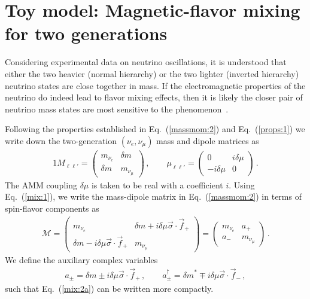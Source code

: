 \documentclass[addchapnum]{ws-rv961x669} %
\newcommand{\req}[1]{Eq.~(\ref{#1})}
\begin{document}
\section{Toy model: Magnetic-flavor mixing for two generations}
\label{sec:mix}
Considering experimental data on neutrino oscillations, it is understood that either the two heavier (normal hierarchy) or the two lighter (inverted hierarchy) neutrino states are close together in mass. If the electromagnetic properties of the neutrino do indeed lead to flavor mixing effects, then it is likely the closer pair of neutrino mass states are most sensitive to the phenomenon~\cite{Bethe:1986ej}. 

Following the properties established in \req{massmom:2} and \req{props:1} we write down the two-generation $(\nu_{e},\nu_{\mu})$ mass and dipole matrices as
\begin{alignat}{1}
	\label{mix:1} M_{\ell\ell'}= 
	\begin{pmatrix}
		m_{\nu_{e}} & {\delta m}\\
		{\delta m} & m_{\nu_{\mu}}
	\end{pmatrix}\,,\qquad
	\mu_{\ell\ell'} = 
	\begin{pmatrix}
		0 & i\delta\mu\\
		-i\delta\mu & 0
	\end{pmatrix}\,.
\end{alignat}
The AMM coupling $\delta\mu$ is taken to be real with a coefficient $i$. Using \req{mix:1}, we write the mass-dipole matrix in \req{massmom:2} in terms of spin-flavor components as
\begin{align}
	\label{mix:2a}
    \mathcal{M} = 
	\begin{pmatrix}
		m_{\nu_{e}} & {\delta m}+i\delta\mu\vec{\sigma}\cdot\vec{f}_{+}\\
		{\delta m}-i\delta\mu\vec{\sigma}\cdot\vec{f}_{+} & m_{\nu_{\mu}}
	\end{pmatrix}=
    \begin{pmatrix}
        m_{\nu_{e}} & a_{+}\\
        a_{-} & m_{\nu_{\mu}}
    \end{pmatrix}\,.
\end{align}
We define the auxiliary complex variables
\begin{align}
    \label{mix:2b}
    a_{\pm}={\delta m}\pm i\delta\mu\vec{\sigma}\cdot\vec{f}_{+}\,,\qquad
    a_{\pm}^{\dag}={\delta m}^{*}\mp i\delta\mu\vec{\sigma}\cdot\vec{f}_{-}\,,
\end{align}
such that \req{mix:2a} can be written more compactly.
\end{document}

